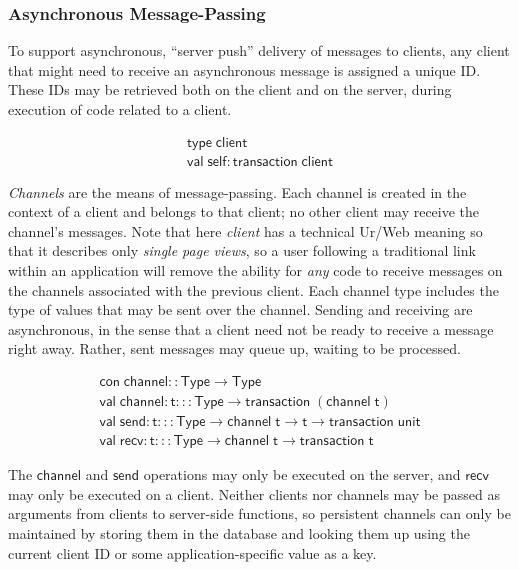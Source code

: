 \documentclass{article}
\newcommand{\mt}[1]{\mathsf{#1}}
\begin{document}
\subsubsection{Asynchronous Message-Passing}

To support asynchronous, ``server push'' delivery of messages to clients, any client that might need to receive an asynchronous message is assigned a unique ID.  These IDs may be retrieved both on the client and on the server, during execution of code related to a client.

$$\begin{array}{l}
  \mt{type} \; \mt{client} \\
  \mt{val} \; \mt{self} : \mt{transaction} \; \mt{client}
\end{array}$$

\emph{Channels} are the means of message-passing.  Each channel is created in the context of a client and belongs to that client; no other client may receive the channel's messages.  Note that here \emph{client} has a technical Ur/Web meaning so that it describes only \emph{single page views}, so a user following a traditional link within an application will remove the ability for \emph{any} code to receive messages on the channels associated with the previous client.  Each channel type includes the type of values that may be sent over the channel.  Sending and receiving are asynchronous, in the sense that a client need not be ready to receive a message right away.  Rather, sent messages may queue up, waiting to be processed.

$$\begin{array}{l}
  \mt{con} \; \mt{channel} :: \mt{Type} \to \mt{Type} \\
  \mt{val} \; \mt{channel} : \mt{t} ::: \mt{Type} \to \mt{transaction} \; (\mt{channel} \; \mt{t}) \\
  \mt{val} \; \mt{send} : \mt{t} ::: \mt{Type} \to \mt{channel} \; \mt{t} \to \mt{t} \to \mt{transaction} \; \mt{unit} \\
  \mt{val} \; \mt{recv} : \mt{t} ::: \mt{Type} \to \mt{channel} \; \mt{t} \to \mt{transaction} \; \mt{t}
\end{array}$$

The $\mt{channel}$ and $\mt{send}$ operations may only be executed on the server, and $\mt{recv}$ may only be executed on a client.  Neither clients nor channels may be passed as arguments from clients to server-side functions, so persistent channels can only be maintained by storing them in the database and looking them up using the current client ID or some application-specific value as a key.
\end{document}

